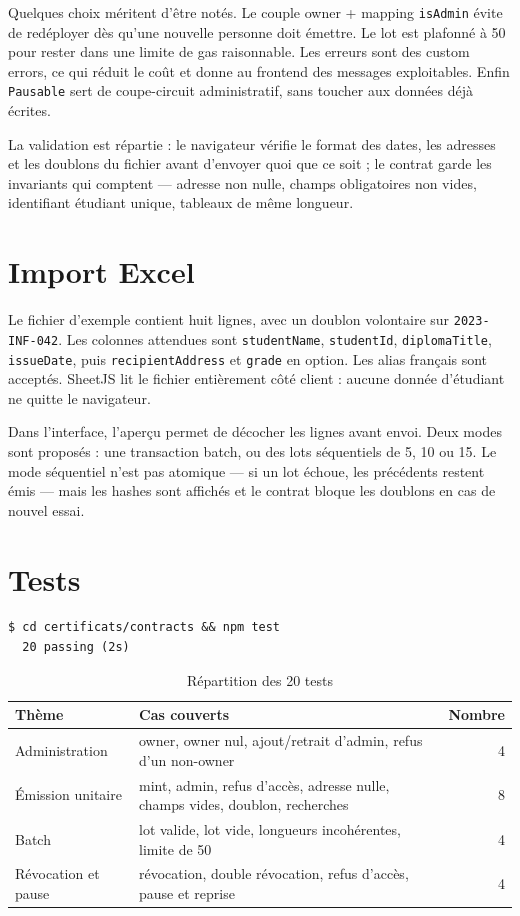 \documentclass[11pt,a4paper,parskip=half]{scrartcl}
\begin{document}
Quelques choix méritent d'être notés. Le couple owner + mapping \texttt{isAdmin}
évite de redéployer dès qu'une nouvelle personne doit émettre. Le lot est plafonné
à 50 pour rester dans une limite de gas raisonnable. Les erreurs sont des custom
errors, ce qui réduit le coût et donne au frontend des messages exploitables.
Enfin \texttt{Pausable} sert de coupe-circuit administratif, sans toucher aux
données déjà écrites.

La validation est répartie : le navigateur vérifie le format des dates, les
adresses et les doublons du fichier avant d'envoyer quoi que ce soit ; le contrat
garde les invariants qui comptent --- adresse non nulle, champs obligatoires non
vides, identifiant étudiant unique, tableaux de même longueur.

\section{Import Excel}

Le fichier d'exemple contient huit lignes, avec un doublon volontaire sur
\texttt{2023-INF-042}. Les colonnes attendues sont \texttt{studentName},
\texttt{studentId}, \texttt{diplomaTitle}, \texttt{issueDate}, puis
\texttt{recipientAddress} et \texttt{grade} en option. Les alias français sont
acceptés. SheetJS lit le fichier entièrement côté client : aucune donnée
d'étudiant ne quitte le navigateur.

Dans l'interface, l'aperçu permet de décocher les lignes avant envoi. Deux modes
sont proposés : une transaction batch, ou des lots séquentiels de 5, 10 ou 15.
Le mode séquentiel n'est pas atomique --- si un lot échoue, les précédents
restent émis --- mais les hashes sont affichés et le contrat bloque les doublons
en cas de nouvel essai.

\section{Tests}

\begin{lstlisting}[basicstyle=\ttfamily\small]
$ cd certificats/contracts && npm test
  20 passing (2s)
\end{lstlisting}

\begin{table}[htbp]
\centering
\caption{Répartition des 20 tests}
\small
\begin{tabularx}{\textwidth}{@{}lXr@{}}
\toprule
Thème & Cas couverts & Nombre \\
\midrule
Administration & owner, owner nul, ajout/retrait d'admin, refus d'un non-owner & 4 \\
Émission unitaire & mint, admin, refus d'accès, adresse nulle, champs vides, doublon, recherches & 8 \\
Batch & lot valide, lot vide, longueurs incohérentes, limite de 50 & 4 \\
Révocation et pause & révocation, double révocation, refus d'accès, pause et reprise & 4 \\
\bottomrule
\end{tabularx}
\end{table}
\end{document}
